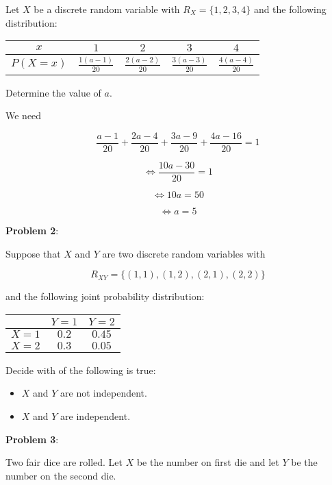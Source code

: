 \documentclass{article}
\begin{document}
Let $X$ be a discrete random variable with $R_X=\{1,2,3,4\}$ and the following distribution:

\begin{center}
    \begin{tabular}{|c|c|c|c|c|}
        \hline
        $x$&$1$&$2$&$3$&$4$\\
        \hline
        $P(X=x)$&$\frac{1(a-1)}{20}$&$\frac{2(a-2)}{20}$&$\frac{3(a-3)}{20}$&$\frac{4(a-4)}{20}$\\
        \hline
    \end{tabular}
\end{center}

Determine the value of $a$.

{\color{blue}

We need 

$$\frac{a-1}{20}+\frac{2a-4}{20}+\frac{3a-9}{20}+\frac{4a-16}{20}=1$$

$$\Leftrightarrow\frac{10a-30}{20}=1$$

$$\Leftrightarrow10a=50$$

$$\Leftrightarrow a=5$$

}

\noindent\textbf{Problem 2}:

Suppose that $X$ and $Y$ are two discrete random variables with

$$R_{XY}=\{(1,1),(1,2),(2,1),(2,2)\}$$

and the following joint probability distribution:

\begin{center}
    \begin{tabular}{|c|c|c|}
        \hline
        &$Y=1$&$Y=2$\\
        \hline
        $X=1$&$0.2$&$0.45$\\
        \hline
        $X=2$&$0.3$&$0.05$\\
        \hline
    \end{tabular}
\end{center}

Decide with of the following is true:

\begin{itemize}
    \item {\color{blue}$X$ and $Y$ are not independent.}
    \item $X$ and $Y$ are independent.
\end{itemize}

\noindent\textbf{Problem 3}:

Two fair dice are rolled. Let $X$ be the number on first die and let $Y$ be the number on the second die.
\end{document}
